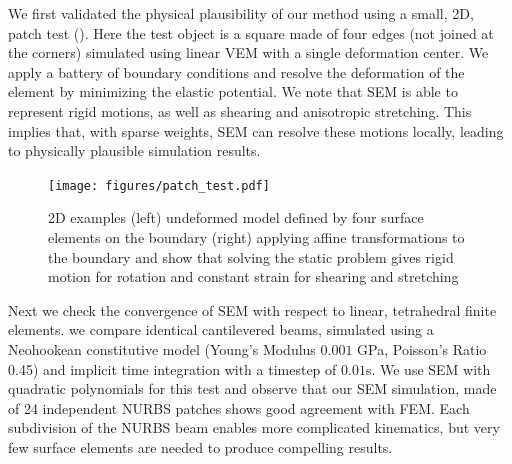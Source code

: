 

We first validated the physical plausibility of our method using a small, 2D, patch test (). 
Here the test object is a square made of four edges (not joined at the corners) simulated using linear VEM with a single deformation center.
We apply a battery of boundary conditions and resolve the deformation of the element by minimizing the elastic potential.
We note that SEM is able to represent rigid motions, as well as shearing and anisotropic stretching. 
This implies that, with sparse weights, SEM can resolve these motions locally, leading to physically plausible simulation results.

\begin{figure}[h]
  \texttt{[image: figures/patch\_test.pdf]}
  \caption{2D examples (left) undeformed model defined by four surface elements on the boundary (right) applying affine transformations to the boundary and show that solving the static problem gives rigid motion for rotation and constant strain for shearing and stretching}
  \label{fig:patchtest}
\end{figure}

Next we check the convergence of SEM with respect to linear, tetrahedral finite elements.  we compare identical cantilevered beams, simulated using 
a Neohookean constitutive model (Young's Modulus $0.001$ GPa, Poisson's Ratio 0.45) and implicit time integration with a timestep of $0.01$s. 
We use SEM with quadratic polynomials for this test and observe that our SEM simulation, made of 24 independent NURBS patches shows good agreement with FEM. Each subdivision of the NURBS beam enables more complicated kinematics, but very few surface elements are needed to produce compelling results.

